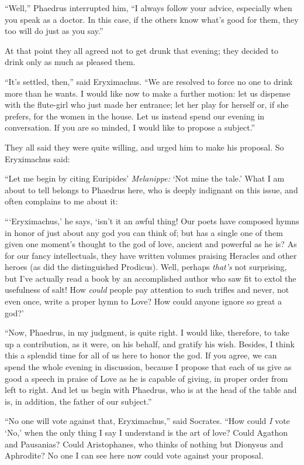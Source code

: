 “Well,” Phaedrus interrupted him, “I always follow your advice,
especially when you speak as a doctor. In this case, if the others know
what's good for them, they too will do just as you say.”

At that point they all agreed not to get drunk that evening;
they decided to drink only as much as pleased them.

“It's settled, then,” said Eryximachus. “We are resolved to force no one
to drink more than he wants. I would like now to make a further motion:
let us dispense with the flute-girl who just made her entrance; let her
play for herself or, if she prefers, for the women in the house. Let us
instead spend our evening in conversation. If you are so minded, I would
like to propose a subject.”

They all said they were quite willing, and urged him to make his
proposal. So Eryximachus said:

“Let me begin by citing Euripides' {\em Melanippe:} ‘Not mine the tale.'
What I am about to tell belongs to Phaedrus here, who is deeply
indignant on this issue, and often complains to me about it:

“‘Eryximachus,' he says, ‘isn't it an awful thing! Our poets have
composed hymns in honor of just about any god you can think of; but has
a single one of them given one moment's thought to the god of
love, ancient and powerful as he is? As for our fancy intellectuals,
they have written volumes praising Heracles and other heroes (as did the
distinguished Prodicus). Well, perhaps {\em that's} not surprising, but
I've actually read a book by an accomplished author who saw fit
to extol the usefulness of salt! How {\em could} people pay attention to
such trifles and never, not even once, write a proper hymn to Love? How
could anyone ignore so great a god?'

“Now, Phaedrus, in my judgment, is quite right. I would like, therefore,
to take up a contribution, as it were, on his behalf, and gratify his
wish. Besides, I think this a splendid time for all of us here
to honor the god. If you agree, we can spend the whole evening in
discussion, because I propose that each of us give as good a speech in
praise of Love as he is capable of giving, in proper order from left to
right. And let us begin with Phaedrus, who is at the head of the table
and is, in addition, the father of our subject.”

“No one will vote against that, Eryximachus,” said Socrates. “How could
{\em I} vote ‘No,' when the only thing I say I understand is the
art of love? Could Agathon and Pausanias? Could Aristophanes, who thinks
of nothing but Dionysus and Aphrodite? No one I can see here now could
vote against your proposal.

